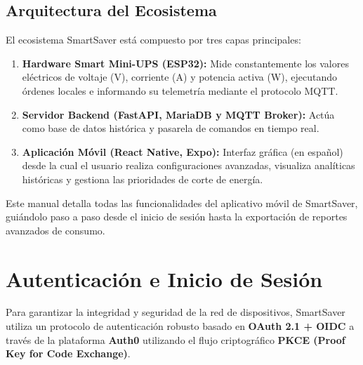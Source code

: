 \documentclass[11pt,a4paper]{article}
\begin{document}
\subsection{Arquitectura del Ecosistema}
El ecosistema SmartSaver está compuesto por tres capas principales:
\begin{enumerate}
    \item \textbf{Hardware Smart Mini-UPS (ESP32):} Mide constantemente los valores eléctricos de voltaje (V), corriente (A) y potencia activa (W), ejecutando órdenes locales e informando su telemetría mediante el protocolo MQTT.
    \item \textbf{Servidor Backend (FastAPI, MariaDB y MQTT Broker):} Actúa como base de datos histórica y pasarela de comandos en tiempo real.
    \item \textbf{Aplicación Móvil (React Native, Expo):} Interfaz gráfica (en español) desde la cual el usuario realiza configuraciones avanzadas, visualiza analíticas históricas y gestiona las prioridades de corte de energía.
\end{enumerate}

\begin{infoBox}
Este manual detalla todas las funcionalidades del aplicativo móvil de SmartSaver, guiándolo paso a paso desde el inicio de sesión hasta la exportación de reportes avanzados de consumo.
\end{infoBox}

\section{Autenticación e Inicio de Sesión}
Para garantizar la integridad y seguridad de la red de dispositivos, SmartSaver utiliza un protocolo de autenticación robusto basado en \textbf{OAuth 2.1 + OIDC} a través de la plataforma \textbf{Auth0} utilizando el flujo criptográfico \textbf{PKCE (Proof Key for Code Exchange)}.
\end{document}
